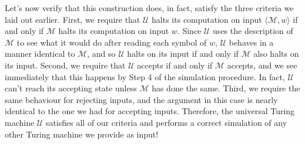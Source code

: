 Let's now verify that this construction does, in fact, satisfy the three criteria we laid out earlier. First, we require that $\mathcal{U}$ halts its computation on input $\langle \mathcal{M}, w \rangle$ if and only if $\mathcal{M}$ halts its computation on input $w$. Since $\mathcal{U}$ uses the description of $\mathcal{M}$ to see what it would do after reading each symbol of $w$, $\mathcal{U}$ behaves in a manner identical to $\mathcal{M}$, and so $\mathcal{U}$ halts on its input if and only if $\mathcal{M}$ also halts on its input. Second, we require that $\mathcal{U}$ accepts if and only if $\mathcal{M}$ accepts, and we see immediately that this happens by Step 4 of the simulation procedure. In fact, $\mathcal{U}$ can't reach its accepting state unless $\mathcal{M}$ has done the same. Third, we require the same behaviour for rejecting inputs, and the argument in this case is nearly identical to the one we had for accepting inputs. Therefore, the universal Turing machine $\mathcal{U}$ satisfies all of our criteria and performs a correct simulation of any other Turing machine we provide as input!